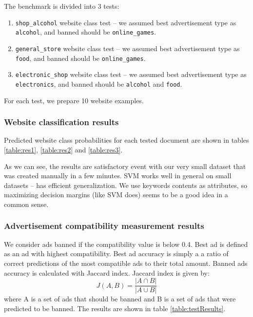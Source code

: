 \documentclass[a4paper]{article}
\begin{document}
The benchmark is divided into 3 tests:
\begin{enumerate}
    \item \texttt{shop\_alcohol} website class test --
        we assumed best advertisement type as \texttt{alcohol},
        and banned should be \texttt{online\_games}.
    \item \texttt{general\_store} website class test --
        we assumed best advertisement type as \texttt{food},
        and banned should be \texttt{online\_games}.
    \item \texttt{electronic\_shop} website class test --
        we assumed best advertisement type as \texttt{electronics},
        and banned should be \texttt{alcohol} and \texttt{food}.
\end{enumerate}
For each test, we prepare 10 website examples.


\subsubsection {Website classification results}
Predicted website class probabilities for each tested document are shown in
tables
\ref{table:res1},
\ref{table:res2} and
\ref{table:res3}.

As we can see, the results are satisfactory event with our very small dataset
that was created manually in a few minutes.
SVM works well in general on small datasets -- has efficient generalization.
We use keywords contents as attributes, so maximizing decision margins (like SVM does)
seems to be a good idea in a common sense.

\subsubsection {Advertisement compatibility measurement results}
\label{benchCompat}
We consider ads banned if the compatibility value is below 0.4.
Best ad is defined as an ad with highest compatibility.
Best ad accuracy is simply a a ratio of correct predictions
of the most compatible ads to their total amount.
Banned ads accuracy is calculated with Jaccard index.
Jaccard index is given by:
\begin{equation}
    J(A,B) = \frac{|A\cap B|}{|A\cup B|}
\end{equation}
where A is a set of ads that should be banned and B is a set of ads that were predicted to be banned.
The results are shown in table \ref{table:testResults}.
\end{document}
